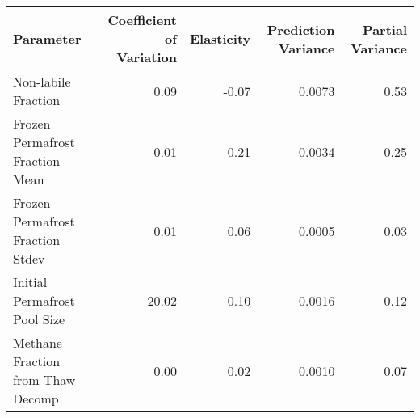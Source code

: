 \begin{tabular}{lrrrr}
  \toprule
Parameter & Coefficient of Variation & Elasticity & Prediction Variance & Partial Variance \\ 
  \midrule
Non-labile Fraction & 0.09 & -0.07 & 0.0073 & 0.53 \\ 
  Frozen Permafrost Fraction Mean & 0.01 & -0.21 & 0.0034 & 0.25 \\ 
  Frozen Permafrost Fraction Stdev & 0.01 & 0.06 & 0.0005 & 0.03 \\ 
  Initial Permafrost Pool Size & 20.02 & 0.10 & 0.0016 & 0.12 \\ 
  Methane Fraction from Thaw Decomp & 0.00 & 0.02 & 0.0010 & 0.07 \\ 
   \bottomrule
\end{tabular}
